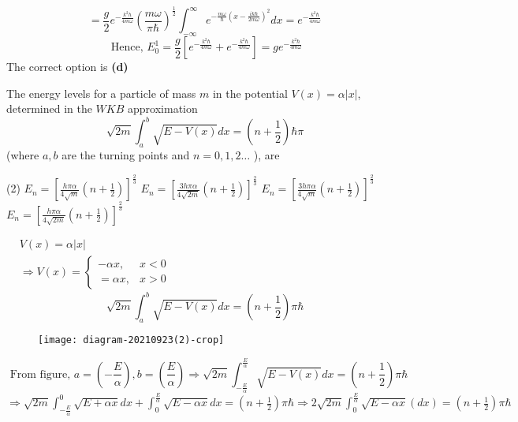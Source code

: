 \begin{enumerate}
\begin{answer}
	$$
	=\frac{g}{2} e^{-\frac{k^{2} h}{4 m \omega}}\left(\frac{m \omega}{\pi \hbar}\right)^{\frac{1}{2}} \int_{-\infty}^{\infty} e^{-\frac{m \omega}{\hbar}\left(x-\frac{i k \hbar}{2 m \omega}\right)^{2}} d x=e^{-\frac{k^{2} \hbar}{4 m \omega}}
	$$
	$$
	\text { Hence, } E_{0}^{1}=\frac{g}{2}\left[e^{-\frac{k^{2} \hbar}{4 m \omega}}+e^{-\frac{k^{2} \hbar}{4 m \omega}}\right]=g e^{-\frac{k^{2} \hbar}{4 m \omega}}
	$$
	The correct option is \textbf{(d)}
\end{answer}
\begin{minipage}{\textwidth}
	\item The energy levels for a particle of mass $m$ in the potential $V(x)=\alpha|x|$, determined in the $W K B$ approximation
	$$
	\sqrt{2 m} \int_{a}^{b} \sqrt{E-V(x)} d x=\left(n+\frac{1}{2}\right) \hbar \pi
	$$
	(where $a, b$ are the turning points and $n=0,1,2 \ldots$ ), are
\end{minipage}
\begin{tasks}(2)
	\task[\textbf{A.}] $E_{n}=\left[\frac{h \pi \alpha}{4 \sqrt{m}}\left(n+\frac{1}{2}\right)\right]^{\frac{2}{3}}$
	\task[\textbf{B.}]$E_{n}=\left[\frac{3 h \pi \alpha}{4 \sqrt{2 m}}\left(n+\frac{1}{2}\right)\right]^{\frac{2}{3}}$
	\task[\textbf{C.}]$E_{n}=\left[\frac{3 h \pi \alpha}{4 \sqrt{m}}\left(n+\frac{1}{2}\right)\right]^{\frac{2}{3}}$
	\task[\textbf{D.}] $E_{n}=\left[\frac{h \pi \alpha}{4 \sqrt{2 m}}\left(n+\frac{1}{2}\right)\right]^{\frac{2}{3}}$
\end{tasks}
\begin{answer}$\left. \right. $\\
	$\begin{aligned}
	&V(x)=\alpha|x| \\
	&\Rightarrow V(x)= \begin{cases}-\alpha x, & x<0 \\
	=\alpha x, & x>0\end{cases}
	\end{aligned}$
	$$\sqrt{2 m} \int_{a}^{b} \sqrt{E-V(x)} d x=\left(n+\frac{1}{2}\right) \pi \hbar$$
	\begin{figure}[H]
		\centering
		\texttt{[image: diagram-20210923(2)-crop]}
		\caption{}
		\label{}
	\end{figure}
	$$\text { From figure, } a=\left(-\frac{E}{\alpha}\right), b=\left(\frac{E}{\alpha}\right) \Rightarrow \sqrt{2 m} \int_{-\frac{E}{\alpha}}^{\frac{E}{\alpha}} \sqrt{E-V(x)} d x=\left(n+\frac{1}{2}\right) \pi \hbar$$
	$\Rightarrow \sqrt{2 m} \int_{-\frac{E}{\alpha}}^{0} \sqrt{E+\alpha x} d x+\int_{0}^{\frac{E}{\alpha}} \sqrt{E-\alpha x} d x=\left(n+\frac{1}{2}\right) \pi \hbar \Rightarrow 2 \sqrt{2 m} \int_{0}^{\frac{E}{\alpha}} \sqrt{E-\alpha x}(d x)=\left(n+\frac{1}{2}\right) \pi \hbar$\\

\end{answer}
\end{enumerate}
